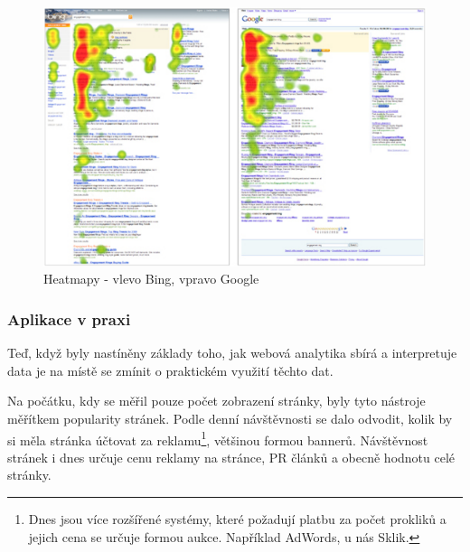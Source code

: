 \documentclass[bc,male,java,dept456]{diploma}						%
\begin{document}
\begin{figure}[hp]
	\centering
	\includegraphics[width=14cm]{img/google-bing-heatmap.pdf}
	\caption{Heatmapy - vlevo Bing, vpravo Google}
	\label{img:heatmap-bing-google}
\end{figure}






\subsubsection{Aplikace v praxi}

Teď, když byly nastíněny základy toho, jak webová analytika sbírá a interpretuje data je na místě se zmínit o praktickém využití těchto dat.


Na počátku, kdy se měřil pouze počet zobrazení stránky, byly tyto nástroje měřítkem popularity stránek. Podle denní návštěvnosti se dalo odvodit, kolik by si měla stránka účtovat za reklamu\footnote{Dnes jsou více rozšířené systémy, které požadují platbu za počet prokliků a jejich cena se určuje formou aukce. Například AdWords, u nás Sklik.}, většinou formou bannerů. Návštěvnost stránek i dnes určuje cenu reklamy na stránce, PR článků a obecně hodnotu celé stránky.
\end{document}

